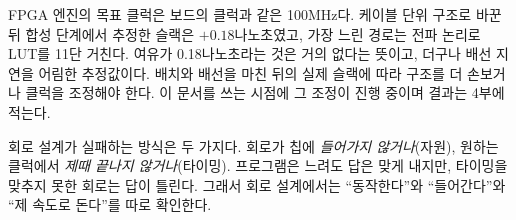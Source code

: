 \Ours FPGA 엔진의 목표 클럭은 보드의 클럭과 같은 100MHz다. 케이블 단위 구조로 바꾼 뒤 합성 단계에서 추정한
슬랙은 $+0.18$나노초였고, 가장 느린 경로는 전파 논리로 LUT를 11단 거친다. 여유가 0.18나노초라는 것은
거의 없다는 뜻이고, 더구나 배선 지연을 어림한 추정값이다. 배치와 배선을 마친 뒤의 실제 슬랙에 따라 구조를
더 손보거나 클럭을 조정해야 한다. 이 문서를 쓰는 시점에 그 조정이 진행 중이며 결과는 4부에 적는다.

\begin{keybox}[title={회로 설계의 두 가지 실패}]
회로 설계가 실패하는 방식은 두 가지다. 회로가 칩에 \emph{들어가지 않거나}(자원), 원하는 클럭에서
\emph{제때 끝나지 않거나}(타이밍). 프로그램은 느려도 답은 맞게 내지만, 타이밍을 맞추지 못한 회로는 답이
틀린다. 그래서 회로 설계에서는 ``동작한다''와 ``들어간다''와 ``제 속도로 돈다''를 따로 확인한다.
\end{keybox}
